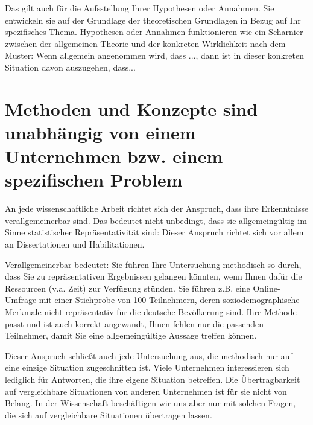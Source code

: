 Das gilt auch für die Aufsstellung Ihrer Hypothesen oder Annahmen. Sie entwickeln sie auf der Grundlage der theoretischen Grundlagen in Bezug auf Ihr spezifisches Thema. Hypothesen oder Annahmen funktionieren wie ein Scharnier zwischen der allgemeinen Theorie und der konkreten Wirklichkeit nach dem Muster: Wenn allgemein angenommen wird, dass ..., dann ist in dieser konkreten Situation davon auszugehen, dass...

\section{Methoden und Konzepte sind unabhängig von einem Unternehmen bzw. einem spezifischen Problem}
\label{sec:methoden-unabhaengig}

An jede wissenschaftliche Arbeit richtet sich der Anspruch, dass ihre Erkenntnisse verallgemeinerbar sind. Das bedeutet nicht unbedingt, dass sie allgemeingültig im Sinne statistischer Repräsentativität sind: Dieser Anspruch richtet sich vor allem an Dissertationen und Habilitationen.

Verallgemeinerbar bedeutet: Sie führen Ihre Untersuchung methodisch so durch, dass Sie zu repräsentativen Ergebnissen gelangen könnten, wenn Ihnen dafür die Ressourcen (v.a. Zeit) zur Verfügung stünden. Sie führen z.B. eine Online-Umfrage mit einer Stichprobe von 100 Teilnehmern, deren soziodemographische Merkmale nicht repräsentativ für die deutsche Bevölkerung sind. Ihre Methode passt und ist auch korrekt angewandt, Ihnen fehlen \glqq nur\grqq{} die passenden Teilnehmer, damit Sie eine allgemeingültige Aussage treffen können.

Dieser Anspruch schließt auch jede Untersuchung aus, die methodisch nur auf eine einzige Situation zugeschnitten ist. Viele Unternehmen interessieren sich lediglich für Antworten, die ihre eigene Situation betreffen. Die Übertragbarkeit auf vergleichbare Situationen von anderen Unternehmen ist für sie nicht von Belang. In der Wissenschaft beschäftigen wir uns aber nur mit solchen Fragen, die sich auf vergleichbare Situationen übertragen lassen.
